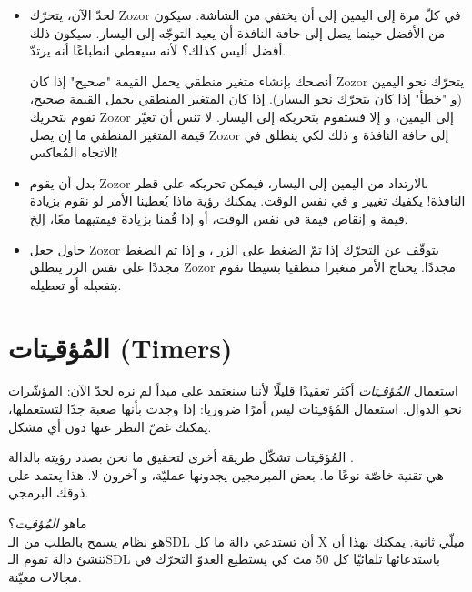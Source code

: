 \begin{itemize}
	\item  لحدّ الآن، يتحرّك 
	\textenglish{Zozor}
	في كلّ مرة إلى اليمين إلى أن يختفي من الشاشة. سيكون من الأفضل حينما يصل إلى حافة النافذة أن يعيد التوجّه إلى اليسار. سيكون ذلك أفضل أليس كذلك؟ لأنه سيعطي انطباعًا أنه يرتدّ.
	
	أنصحك بإنشاء متغير منطقي
	يحمل القيمة "صحيح" إذا كان 
	\textenglish{Zozor}
	يتحرّك نحو اليمين (و "خطأ" إذا كان يتحرّك نحو اليسار). إذا كان المتغير المنطقي يحمل القيمة صحيح، تقوم بتحريك
	\textenglish{Zozor}
	إلى اليمين، و إلا فستقوم بتحريكه إلى اليسار. لا تنس أن تغيّر قيمة المتغير المنطقي ما إن يصل
	\textenglish{Zozor}
	إلى حافة النافذة و ذلك لكي ينطلق في الاتجاه المُعاكس!
	\item بدل أن يقوم 
	\textenglish{Zozor} 
	بالارتداد من اليمين إلى اليسار، فيمكن تحريكه على قطر النافذة! يكفيك تغيير 
	و 
	في نفس الوقت. يمكنك رؤية ماذا يُعطينا الأمر لو نقوم بزيادة قيمة 
	و إنقاص قيمة 
	في نفس الوقت، أو إذا قُمنا بزيادة قيمتيهما معًا، إلخ.
	\item حاول جعل
	\textenglish{Zozor}
	يتوقّف عن التحرّك إذا تمّ الضغط على الزر
	،
	و إذا تم الضغط مجددًا على نفس الزر ينطلق
	\textenglish{Zozor}
	مجددًا. يحتاج الأمر متغيرا منطقيا بسيطا تقوم بتفعيله أو تعطيله.
\end{itemize}

\section{المُؤقـِتات (\textenglish{Timers})}

\begin{warning}
استعمال 
\textit{المُؤقـِتات}
أكثر تعقيدًا قليلًا لأننا سنعتمد على مبدأ لم نره لحدّ الآن: المؤشّرات نحو الدوال. استعمال المُؤقـِتات ليس أمرًا ضروريا: إذا وجدت بأنها صعبة جدًا لتستعملها، يمكنك غضّ النظر عنها دون أي مشكل.
\end{warning}

المُؤقـِتات تشكّل طريقة أخرى لتحقيق ما نحن بصدد رؤيته بالدالة 
.\\
هي تقنية خاصّة نوعًا ما. بعض المبرمجين يجدونها عمليّة، و آخرون لا. هذا يعتمد على ذوقك البرمجي.

ماهو 
\textit{المُؤقـِت}؟\\
هو نظام يسمح بالطلب من الـ\textenglish{SDL}
أن تستدعي دالة ما كل 
\textenglish{X}
ميلّي ثانية. يمكنك بهذا أن تنشئ دالة 
تقوم الـ\textenglish{SDL}
باستدعائها تلقائيّا كل 50 مث كي يستطيع العدوّ التحرّك في مجالات معيّنة.

